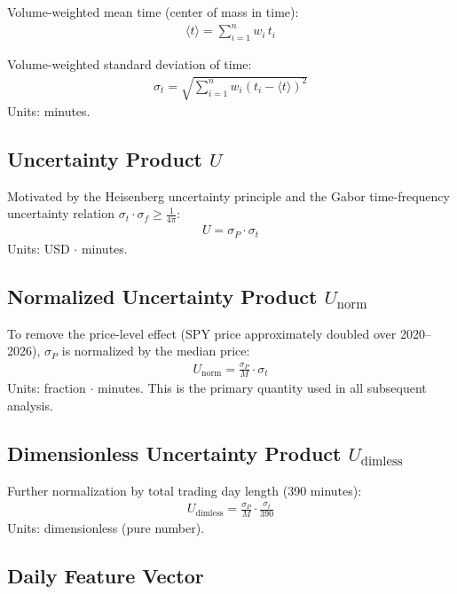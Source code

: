 \documentclass[preprint,12pt]{elsarticle}
\begin{document}
Volume-weighted mean time (center of mass in time):
\begin{align}
    \langle t \rangle = \sum_{i=1}^{n} w_i\, t_i
\end{align}

Volume-weighted standard deviation of time:
\begin{align}
    \sigma_t = \sqrt{\sum_{i=1}^{n} w_i (t_i - \langle t \rangle)^2}
\end{align}
Units: minutes.

\subsection{Uncertainty Product \texorpdfstring{$U$}{U}}

Motivated by the Heisenberg uncertainty principle and the Gabor time-frequency uncertainty relation $\sigma_t \cdot \sigma_f \geq \frac{1}{4\pi}$:
\begin{align}
    U = \sigma_P \cdot \sigma_t
\end{align}
Units: USD $\cdot$ minutes.

\subsection{Normalized Uncertainty Product \texorpdfstring{$U_\mathrm{norm}$}{U\_norm}}

To remove the price-level effect (SPY price approximately doubled over 2020--2026), $\sigma_P$ is normalized by the median price:
\begin{align}
    U_\mathrm{norm} = \frac{\sigma_P}{M} \cdot \sigma_t
\end{align}
Units: fraction $\cdot$ minutes. This is the primary quantity used in all subsequent analysis.

\subsection{Dimensionless Uncertainty Product \texorpdfstring{$U_\mathrm{dimless}$}{U\_dimless}}

Further normalization by total trading day length (390 minutes):
\begin{align}
    U_\mathrm{dimless} = \frac{\sigma_P}{M} \cdot \frac{\sigma_t}{390}
\end{align}
Units: dimensionless (pure number).

\subsection{Daily Feature Vector}
\end{document}
